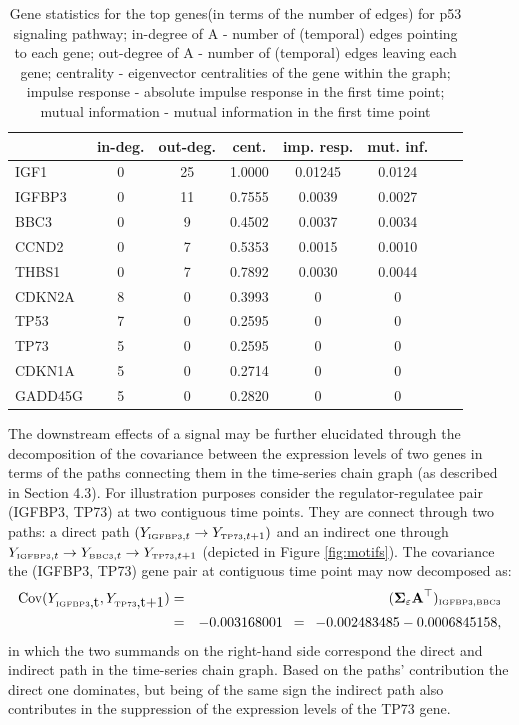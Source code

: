 \documentclass[a4paper]{article}
\begin{document}
\begin{table}
\caption{Gene statistics for the top genes(in terms of the number of edges) for p53 signaling pathway; in-degree of A - number of (temporal) edges pointing to each gene; out-degree of A - number of (temporal) edges leaving each gene; centrality - eigenvector centralities of the gene within the graph;
impulse response - absolute impulse response in the first time point;
mutual information - mutual information in the first time point
}
\begin{tabular}{l*{6}{c}r}
\hline
\hline          
             &\textbf{in-deg.} &\textbf{out-deg.} & \textbf{cent.} & \textbf{imp. resp.} & \textbf{mut. inf.}  \\
\hline
IGF1        & 0 & 25 & 1.0000 & 0.01245 &0.0124\\
IGFBP3      & 0 & 11 & 0.7555 & 0.0039 & 0.0027\\
BBC3       & 0 & 9 & 0.4502 & 0.0037 & 0.0034 \\
CCND2    & 0 & 7 & 0.5353 & 0.0015 & 0.0010 \\
THBS1    & 0 &7 & 0.7892  &0.0030 & 0.0044 \\
CDKN2A    & 8 & 0 & 0.3993 & 0 & 0  \\
TP53    & 7 & 0 &0.2595 & 0 & 0\\
TP73   & 5 & 0 & 0.2595 & 0 & 0\\
CDKN1A       & 5 & 0 & 0.2714 & 0 & 0\\
GADD45G      & 5 & 0 & 0.2820  & 0 & 0\\
\hline
\end{tabular}
\label{table:postEst}
\end{table}

The downstream effects of a signal may be further elucidated through the decomposition of the covariance between the expression levels of two genes in terms of the paths connecting them in the time-series chain graph (as described in Section 4.3). For illustration purposes consider the regulator-regulatee pair (IGFBP3, TP73) at two contiguous time points. They are connect through two paths: a direct path $(Y_{\mbox{{\tiny IGFBP3}},t} \rightarrow Y_{\mbox{{\tiny TP73}},t+1})$ and an indirect one through $Y_{\mbox{{\tiny IGFBP3}},t} \rightarrow Y_{\mbox{{\tiny BBC3}},t}\rightarrow Y_{\mbox{{\tiny TP73}},t+1}$ (depicted in Figure \ref{fig:motifs}). The covariance the (IGFBP3, TP73) gene pair at contiguous time point may now decomposed as:
\begin{eqnarray*}
\mbox{Cov}(Y_{\mbox{{\tiny IGFBP3},t}},Y_{\mbox{{\tiny TP73},t+1}}) & = & (\boldsymbol{\Sigma}_{\varepsilon} \textbf{A}^\top)_{\mbox{{\tiny IGFBP3}}, \mbox{{\tiny BBC3}}} 
\\
& = & -0.003168001 \, \, \, = \, \, \, -0.002483485  - 0.0006845158, 
\end{eqnarray*} 
in which the two summands on the right-hand side correspond the direct and indirect path in the time-series chain graph. Based on the paths' contribution the direct one dominates, but being of the same sign the indirect path also contributes in the suppression of the expression levels of the TP73 gene.
\end{document}
